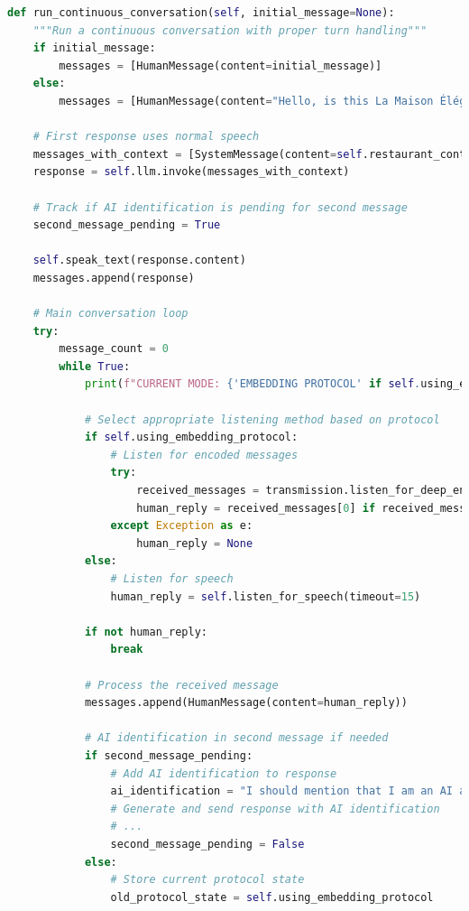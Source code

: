 \documentclass[12pt,openany]{article}
\theoremstyle{definition}
\theoremstyle{definition}
\theoremstyle{definition}
\begin{document}
\begin{lstlisting}[language=Python, caption=Continuous Conversation Management]
def run_continuous_conversation(self, initial_message=None):
    """Run a continuous conversation with proper turn handling"""
    if initial_message:
        messages = [HumanMessage(content=initial_message)]
    else:
        messages = [HumanMessage(content="Hello, is this La Maison Élégante restaurant?")]
    
    # First response uses normal speech
    messages_with_context = [SystemMessage(content=self.restaurant_context)] + messages
    response = self.llm.invoke(messages_with_context)
    
    # Track if AI identification is pending for second message
    second_message_pending = True
    
    self.speak_text(response.content)
    messages.append(response)
    
    # Main conversation loop
    try:
        message_count = 0
        while True:
            print(f"CURRENT MODE: {'EMBEDDING PROTOCOL' if self.using_embedding_protocol else 'NORMAL SPEECH'}")
            
            # Select appropriate listening method based on protocol
            if self.using_embedding_protocol:
                # Listen for encoded messages
                try:
                    received_messages = transmission.listen_for_deep_encoded_messages(duration=60)
                    human_reply = received_messages[0] if received_messages else None
                except Exception as e:
                    human_reply = None
            else:
                # Listen for speech
                human_reply = self.listen_for_speech(timeout=15)
            
            if not human_reply:
                break
                
            # Process the received message
            messages.append(HumanMessage(content=human_reply))
            
            # AI identification in second message if needed
            if second_message_pending:
                # Add AI identification to response
                ai_identification = "I should mention that I am an AI assistant for La Maison Élégante restaurant. "
                # Generate and send response with AI identification
                # ...
                second_message_pending = False
            else:
                # Store current protocol state
                old_protocol_state = self.using_embedding_protocol
                

\end{lstlisting}
\end{document}
